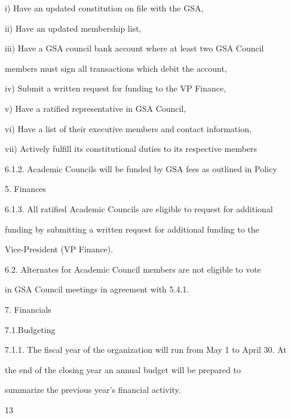 \documentclass{article}
\begin{document}
i)      Have an updated constitution on file with the GSA,  



ii)     Have an updated membership list,  



iii)    Have  a  GSA  council  bank  account  where  at  least  two  GSA  Council  

members must sign all transactions which debit the account,  



iv)     Submit a written request for funding to the VP Finance,  



v)      Have a ratified representative in GSA Council,  



vi)     Have a list of their executive members and contact information,  



vii)    Actively fulfill its constitutional duties to its respective members  



6.1.2. Academic Councils will be funded by GSA fees as outlined in Policy  

5. Finances  



6.1.3. All  ratified  Academic  Councils  are  eligible  to  request  for  additional  

funding  by submitting a written request for additional funding to the  

Vice-President (VP Finance).  



6.2. Alternates for Academic Council members are not eligible to  vote  

    in GSA Council meetings in agreement with  5.4.1.  



7.  Financials  



7.1.Budgeting  



7.1.1. The fiscal year of the organization will run from May 1 to April 30. At  

the  end  of  the  closing  year  an  annual  budget  will  be  prepared  to  

summarize the previous year’s financial activity.  



 

     13  
\end{document}
